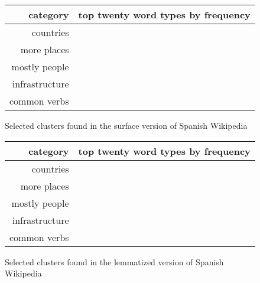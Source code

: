 \begin{figure*}[t!]
  \begin{tabular}{|r|p{10cm}|}
    \hline
    category  & top twenty word types by frequency \\
    \hline
    countries &  \\
    \hline
    more places & \\
    \hline
    mostly people & \\
    \hline
    infrastructure & \\
    \hline
    common verbs & \\
    \hline
  \end{tabular}
\caption{Selected clusters found in the surface version of Spanish Wikipedia}
\label{fig:clusters-wikipedia-surface}
\end{figure*}

\begin{figure*}[t!]
  \begin{tabular}{|r|p{10cm}|}
    \hline
    category  & top twenty word types by frequency \\
    \hline
    countries &  \\
    \hline
    more places & \\
    \hline
    mostly people & \\
    \hline
    infrastructure & \\
    \hline
    common verbs & \\
    \hline
  \end{tabular}
\caption{Selected clusters found in the lemmatized version of Spanish Wikipedia}
\label{fig:clusters-wikipedia-lemma}
\end{figure*}

